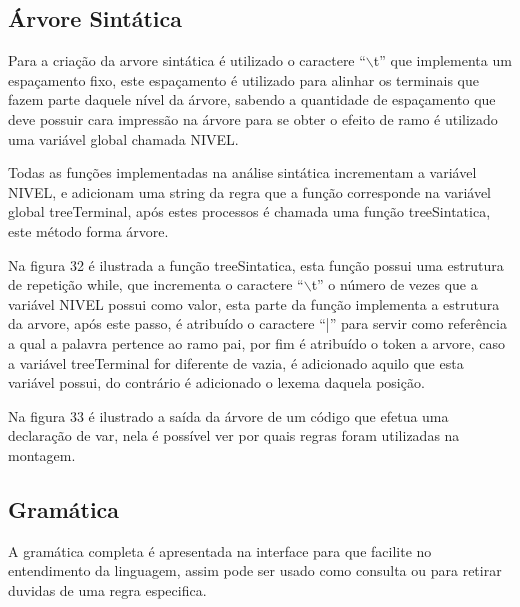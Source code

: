 \documentclass[12pt,oneside,a4paper,chapter=TITLE,section=TITLE,sumario=tradicional]{abntex2}
\begin{document}
\subsection{Árvore Sintática}
\label{subsec:arvore}

Para a criação da arvore sintática é utilizado o caractere “$\backslash$t” que implementa um espaçamento fixo, este espaçamento é utilizado para alinhar os terminais que fazem parte daquele nível da árvore,  sabendo a quantidade de espaçamento que deve possuir cara impressão na árvore para se obter o efeito de ramo é utilizado uma variável global chamada NIVEL.

Todas as funções implementadas na análise sintática incrementam a variável NIVEL, e adicionam uma string da regra que a função corresponde na variável global treeTerminal, após estes processos é chamada uma função treeSintatica, este método forma árvore.

Na figura 32 é ilustrada a função treeSintatica, esta função possui uma estrutura de repetição while, que incrementa o caractere “$\backslash$t” o número de vezes que a variável NIVEL possui como valor, esta parte da função implementa a estrutura da arvore, após este passo, é atribuído o caractere “|” para servir como referência a qual a palavra pertence ao ramo pai, por fim é atribuído o token a arvore, caso a variável treeTerminal for diferente de vazia, é adicionado aquilo que esta variável possui, do contrário é adicionado o lexema daquela posição. 

\begin{figure}[htb]
\end{figure} 

Na figura 33 é ilustrado a saída da árvore de um código que efetua uma declaração de var, nela é possível ver por quais regras foram utilizadas na montagem. 

\begin{figure}[htb]
\end{figure} 

\subsection{Gramática}
\label{subsec:gramatica}

A gramática completa é apresentada na interface para que facilite no entendimento da linguagem, assim pode ser usado como consulta ou para retirar duvidas de uma regra especifica. 
\end{document}
